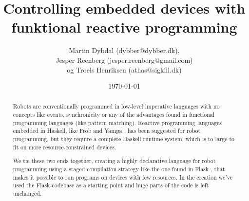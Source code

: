 \documentclass[a4paper, oneside, draft]{memoir}
\title{Controlling embedded devices with funktional reactive programming}
\author{Martin Dybdal (dybber@dybber.dk), \\
Jesper Reenberg (jesper.reenberg@gmail.com) \\ og
Troels Henriksen (athas@sigkill.dk)}
\date{\today}
\begin{document}
\maketitle

\begin{abstract}
  Robots are conventionally programmed in low-level imperative
  languages with no concepts like events, synchronicity or any of the
  advantages found in functional programming languages (like pattern
  matching). Reactive programming languages embedded in Haskell, like
  Frob \cite{frob99} and Yampa \cite{arrowsrobotsfrp02}, has been
  suggested for robot programming, but they require a complete Haskell
  runtime system, which is to large to fit on more
  resource-constrained devices. 

  We tie these two ends together, creating a highly declarative
  language for robot programming using a staged compilation-strategy
  like the one found in Flask \cite{flask08}, that makes it possible
  to run programs on devices with few resources. In the creation we've
  used the Flask-codebase as a starting point and huge parts of the
  code is left unchanged.
\end{abstract}
\end{document}
